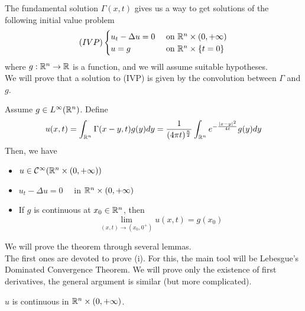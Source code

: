 The fundamental solution $\Gamma(x,t)$ gives us a way to get solutions of the following initial value problem
\begin{equation*} (IVP)
    \begin{cases}
        u_t - \Delta u = 0 & \text{ on  } \mathbb{R}^n \times (0,+\infty) \\
        u=g & \text{ on  } \mathbb{R}^n \times \{t=0\}
    \end{cases}
\end{equation*}
where $g:\mathbb{R}^n \rightarrow \mathbb{R}$ is a function, and we will assume suitable hypotheses. \\
We will prove that a solution to (IVP) is given by the convolution between $\Gamma$ and $g$.    
\begin{ThBox}
    \begin{Th}
        Assume $g \in L^\infty(\mathbb{R}^n)$. Define 
        \begin{equation*}
            u(x,t) = \int_{\mathbb{R}^n}\Gamma(x-y,t) g(y) dy = \frac{1}{(4 \pi t)^\frac{n}{2}}\int_{\mathbb{R}^n} e^{-\frac{|x-y|^2}{4t}} g(y) dy 
        \end{equation*}
        Then, we have
        \begin{itemize}
            \item $u \in \mathcal{C}^\infty(\mathbb{R}^n \times (0,+\infty))$
            \item $u_t - \Delta u = 0 \quad$ in $\mathbb{R}^n \times (0,+\infty)$
            \item If $g$ is continuous at $x_0 \in \mathbb{R}^n$, then
            \begin{equation*}
                \lim_{(x,t) \rightarrow (x_0, 0^+)} u(x,t) = g(x_0)
            \end{equation*}
        \end{itemize}
    \end{Th}
\end{ThBox}
We will prove the theorem through several lemmas. \\
The first ones are devoted to prove (i). For this, the main tool will be Lebesgue's Dominated Convergence Theorem. We will prove only the existence of first derivatives, the general argument is similar (but more complicated). 

\begin{PropBox}
    \begin{Lemma}[Lemma 1]
    \label{Lemma 1}
        $u$ is continuous in $\mathbb{R}^n \times (0,+\infty)$.
    \end{Lemma}
\end{PropBox}

